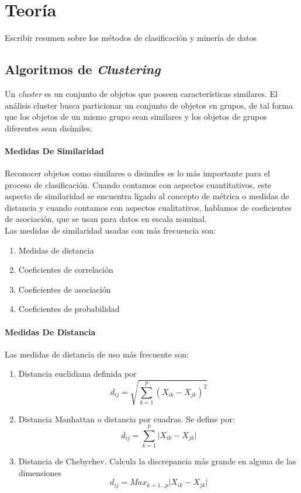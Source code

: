 \chapter{Teoría}
\label{chap:teoria}
Escribir resumen sobre los métodos de clasificación y minería de datos

\section{Algoritmos de \textit{Clustering}}

Un \textit{cluster} es un conjunto de objetos que poseen características similares.  El análisis cluster busca particionar un conjunto de objetos en grupos, de tal forma que los objetos de un mismo grupo sean similares y los objetos de grupos diferentes sean disímiles.   

\subsubsection{Medidas De Similaridad}

Reconocer objetos como similares o disimiles es lo más importante para el proceso de clasificación.  Cuando contamos con aspectos cuantitativos, este aspecto de similaridad se encuentra ligado al concepto de métrica o medidas de distancia y cuando contamos con aspectos cualitativos, hablamos de coeficientes de asociación, que se usan para datos en escala nominal.
\ \\
Las medidas de similaridad usadas con más frecuencia son: 
\begin{enumerate}
\item Medidas de distancia
\item Coeficientes de correlación 
\item Coeficientes de asociación
\item Coeficientes de probabilidad
\end{enumerate}

\subsubsection*{Medidas De Distancia}

Las medidas de distancia de uso más frecuente son:

\begin{enumerate}
\item Distancia euclidiana definida por
$$d_{ij} = \sqrt{\sum \limits_{k=1}^{p} (X_{ik}-X_{	jk})^2}$$
\item Distancia Manhattan o distancia por cuadras. Se define por:
$$d_{ij} = \sum \limits_{k=1}^{p} \vert X_{ik}-X_{jk} \vert$$
\item Distancia de Chebychev.  Calcula la discrepancia más grande en alguna de las dimensiones
$$d_{ij} = Max_{k=1...p} \vert X_{ik}-X_{jk} \vert$$
\end{enumerate}

